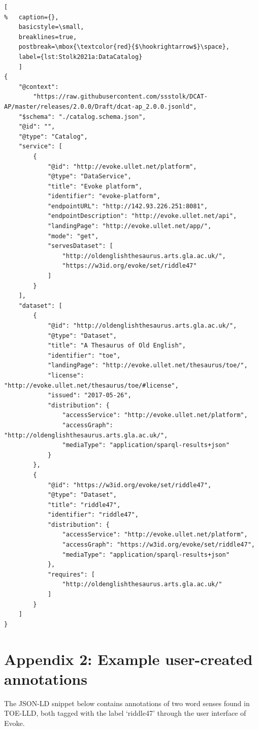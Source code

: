 \noindent
\begin{minipage}[c]{\textwidth}
	\begin{lstlisting}[
%	caption={},
    basicstyle=\small,
    breaklines=true, 
    postbreak=\mbox{\textcolor{red}{$\hookrightarrow$}\space},
	label={lst:Stolk2021a:DataCatalog}
	]
{
	"@context": 
		"https://raw.githubusercontent.com/ssstolk/DCAT-AP/master/releases/2.0.0/Draft/dcat-ap_2.0.0.jsonld",
	"$schema": "./catalog.schema.json",
	"@id": "",
	"@type": "Catalog",
	"service": [
		{
			"@id": "http://evoke.ullet.net/platform",
			"@type": "DataService",
			"title": "Evoke platform",
			"identifier": "evoke-platform",
			"endpointURL": "http://142.93.226.251:8081",
			"endpointDescription": "http://evoke.ullet.net/api",
			"landingPage": "http://evoke.ullet.net/app/",
			"mode": "get",
			"servesDataset": [
				"http://oldenglishthesaurus.arts.gla.ac.uk/",
				"https://w3id.org/evoke/set/riddle47"
			]
		}
	],
	"dataset": [
		{
			"@id": "http://oldenglishthesaurus.arts.gla.ac.uk/",
			"@type": "Dataset",
			"title": "A Thesaurus of Old English",
			"identifier": "toe",
			"landingPage": "http://evoke.ullet.net/thesaurus/toe/",
			"license": "http://evoke.ullet.net/thesaurus/toe/#license",
			"issued": "2017-05-26",
			"distribution": {
				"accessService": "http://evoke.ullet.net/platform",
				"accessGraph": "http://oldenglishthesaurus.arts.gla.ac.uk/",
				"mediaType": "application/sparql-results+json"
			}
		},
		{
			"@id": "https://w3id.org/evoke/set/riddle47",
			"@type": "Dataset",
			"title": "riddle47",
			"identifier": "riddle47",
			"distribution": {
				"accessService": "http://evoke.ullet.net/platform",
				"accessGraph": "https://w3id.org/evoke/set/riddle47",
				"mediaType": "application/sparql-results+json"
			},
			"requires": [
				"http://oldenglishthesaurus.arts.gla.ac.uk/"
			]
		}
	]
}
	\end{lstlisting}
\end{minipage}

\section{Appendix 2: Example user-created annotations}
The JSON-LD snippet below contains annotations of two word senses found in TOE-LLD, both tagged with the label ‘riddle47’ through the user interface of Evoke.


